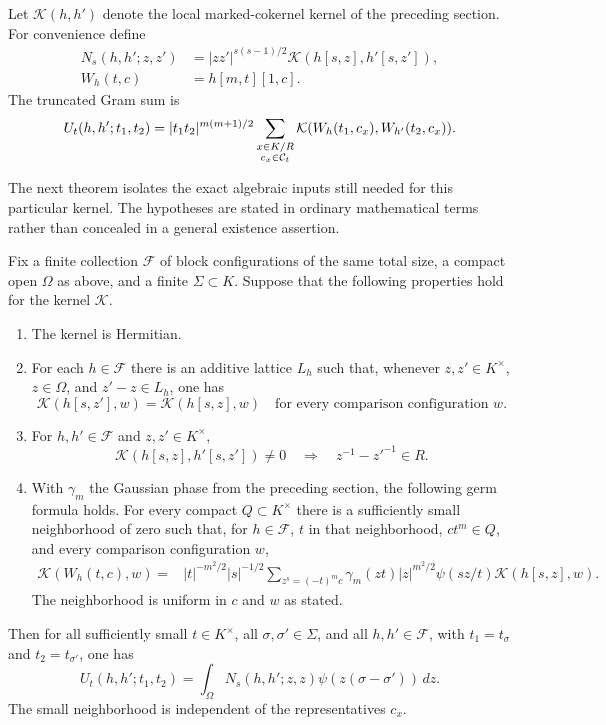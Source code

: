 Let $\mathcal K(h,h')$ denote the local marked-cokernel kernel of
the preceding section.  For convenience define
\begin{align}
 N_s(h,h';z,z')
   &=|zz'|^{s(s-1)/2}
                 \mathcal K(h[s,z],h'[s,z']),\\
 W_h(t,c)&=h[m,t][1,c].
\end{align}
The truncated Gram sum is
\begin{equation}\label{orb-cut-gram}
 U_t(h,h';t_1,t_2)=|t_1t_2|^{m(m+1)/2}
       \sum_{\substack{x\in K/R\cr c_x\in\mathcal C_t}}
          \mathcal K(W_h(t_1,c_x),W_{h'}(t_2,c_x)).
\end{equation}

The next theorem isolates the exact algebraic inputs still needed
for this particular kernel.  The hypotheses are stated in
ordinary mathematical terms rather than concealed in a general
existence assertion.

\begin{theorem}\label{orb-cut-identity}
Fix a finite collection $\mathcal F$ of block configurations of
the same total size, a compact open $\Omega$ as above, and a
finite $\Sigma\subset K$.  Suppose that the following properties
hold for the kernel $\mathcal K$.
\begin{enumerate}
\item The kernel is Hermitian.
\item For each $h\in\mathcal F$ there is an additive lattice
$L_h$ such that, whenever $z,z'\in K^\times$, $z\in\Omega$,
and $z'-z\in L_h$, one has
\[
 \mathcal K(h[s,z'],w)=\mathcal K(h[s,z],w)
 \quad\text{for every comparison configuration }w.
\]
\item For $h,h'\in\mathcal F$ and $z,z'\in K^\times$,
\begin{equation}\label{orb-inverse-support}
 \mathcal K(h[s,z],h'[s,z'])\ne0
 \quad\Longrightarrow\quad z^{-1}-z'^{-1}\in R.
\end{equation}
\item With $\gamma_m$ the Gaussian phase from the preceding
section, the following germ formula holds.  For every compact
$Q\subset K^\times$ there is a sufficiently small neighborhood
of zero such that, for $h\in\mathcal F$, $t$ in that neighborhood,
$ct^m\in Q$, and every comparison configuration $w$,
\begin{align}\label{orb-germ-input}
 \mathcal K(W_h(t,c),w)
  ={}&|t|^{-m^2/2}|s|^{-1/2}
       \sum_{z^s=(-t)^m c}\gamma_m(zt)|z|^{m^2/2}
             \psi(sz/t)\mathcal K(h[s,z],w).
\end{align}
The neighborhood is uniform in $c$ and $w$ as stated.
\end{enumerate}
Then for all sufficiently small $t\in K^\times$, all
$\sigma,\sigma'\in\Sigma$, and all $h,h'\in\mathcal F$,
with $t_1=t_\sigma$ and $t_2=t_{\sigma'}$, one has
\begin{equation}\label{orb-exact-cut}
 U_t(h,h';t_1,t_2)
   =\int_\Omega N_s(h,h';z,z)
                         \psi(z(\sigma-\sigma'))\,dz.
\end{equation}
The small neighborhood is independent of the representatives $c_x$.
\end{theorem}

